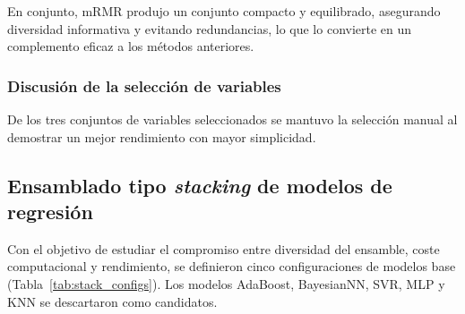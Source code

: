 En conjunto, mRMR produjo un conjunto compacto y equilibrado, asegurando diversidad informativa y evitando redundancias, lo que lo convierte en un complemento eficaz a los métodos anteriores.

\subsubsection{Discusión de la selección de variables}
De los tres conjuntos de variables seleccionados se mantuvo la selección manual al demostrar un mejor rendimiento con mayor simplicidad.

\subsection{Ensamblado tipo \textit{stacking} de modelos de regresión}

Con el objetivo de estudiar el compromiso entre diversidad del ensamble, coste computacional y rendimiento, se definieron cinco configuraciones de modelos base (Tabla~\ref{tab:stack_configs}). Los modelos AdaBoost, BayesianNN, SVR, MLP y KNN se descartaron como candidatos.

\begin{table}
    \centering
    \caption{Configuraciones de modelos base para \textit{stacking}.}
    \label{tab:stack_configs}
\end{table}

